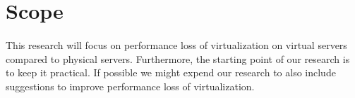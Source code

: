 \section{Scope}
\paragraph{}
This research will focus on performance loss of virtualization on virtual servers compared to physical servers. Furthermore, the starting point of our research is to keep it practical. If possible we might expend our research to also include suggestions to improve performance loss of virtualization. 